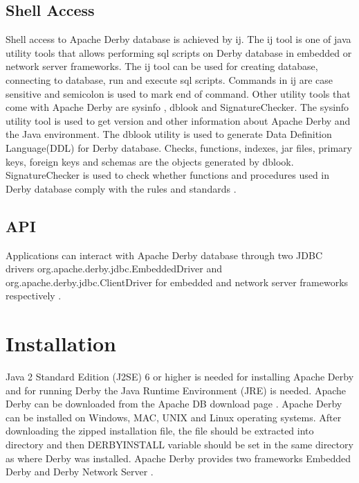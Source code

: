 \documentclass[9pt,twocolumn,twoside]{../../styles/osajnl}
\begin{document}
\subsection{Shell Access}

Shell access to Apache Derby database is achieved by ij. The ij tool
is one of java utility tools that allows performing sql scripts on
Derby database in embedded or network server frameworks. The ij tool
can be used for creating database, connecting to database, run and
execute sql scripts.  Commands in ij are case sensitive and semicolon
is used to mark end of command.  Other utility tools that come with
Apache Derby are sysinfo , dblook and SignatureChecker. The sysinfo
utility tool is used to get version and other information about Apache
Derby and the Java environment. The dblook utility is used to generate
Data Definition Language(DDL) for Derby database. Checks, functions,
indexes, jar files, primary keys, foreign keys and schemas are the
objects generated by dblook. SignatureChecker is used to check whether
functions and procedures used in Derby database comply with the rules
and standards \cite{www-derbyutil}.

\subsection{API}

Applications can interact with Apache Derby database through two JDBC
drivers org.apache.derby.jdbc.EmbeddedDriver and
org.apache.derby.jdbc.ClientDriver for embedded and network server
frameworks respectively \cite{www-derbyutil}.



\section {Installation}

Java 2 Standard Edition (J2SE) 6 or higher is needed for installing
Apache Derby and for running Derby the Java Runtime Environment (JRE)
is needed. Apache Derby can be downloaded from the Apache DB download
page \cite {www-derbydownload}. Apache Derby can be installed on
Windows, MAC, UNIX and Linux operating systems. After downloading the
zipped installation file, the file should be extracted into directory
and then DERBY\textunderscore INSTALL variable should be set in the
same directory as where Derby was installed. Apache Derby provides two
frameworks Embedded Derby and Derby Network Server \cite
{www-derbytutorial}.
\end{document}
